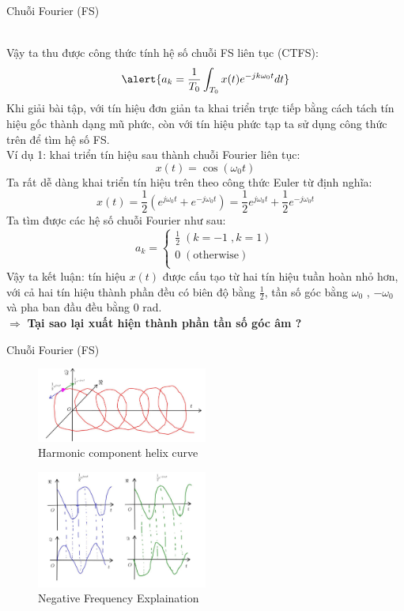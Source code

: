\documentclass[8pt]{beamer}
\begin{document}
\begin{frame}{Chuỗi Fourier (FS)}

\\ Vậy ta thu được công thức tính hệ số chuỗi FS liên tục (CTFS):
$$\alert{a_{k}=\frac{1}{T_{0}}\int_{T_{0}}x(t)e^{-jk\omega_{0}t}dt}$$
Khi giải bài tập, với tín hiệu đơn giản ta khai triển trực tiếp bằng cách tách tín hiệu gốc thành dạng mũ phức, còn với tín hiệu phức tạp ta sử dụng công thức trên để tìm hệ số FS.
\\ Ví dụ 1: khai triển tín hiệu sau thành chuỗi Fourier liên tục:
$$x(t)=\cos(\omega_{0}t)$$
Ta rất dễ dàng khai triển tín hiệu trên theo công thức Euler từ định nghĩa:
$$x(t)=\frac{1}{2}\left(e^{j\omega_{0}t}+e^{-j\omega_{0}t}\right)=\frac{1}{2}e^{j\omega_{0}t}+\frac{1}{2}e^{-j\omega_{0}t}$$
Ta tìm được các hệ số chuỗi Fourier như sau:
\begin{equation*}
	a_{k}=
	\begin{cases}
		\frac{1}{2}\; (k=-1\; , k=1)	\\
		0 \;(\text{otherwise})\\
\end{cases}
\end{equation*}
Vậy ta kết luận: tín hiệu $x(t)$ được cấu tạo từ hai tín hiệu tuần hoàn nhỏ hơn, với cả hai tín hiệu thành phần đều có \alert{biên độ} bằng $\frac{1}{2}$, \alert{tần số góc} bằng $\omega_{0}$ , $-\omega_{0}$ và \alert{pha ban đầu} đều bằng $0$ rad. \\$\Rightarrow$ \textbf{Tại sao lại xuất hiện thành phần tần số góc âm ?}
\end{frame}
\begin{frame}{Chuỗi Fourier (FS)}
\begin{figure}[h]
			\includegraphics[width=0.5\textwidth]{helix.jpg}
			\caption{Harmonic component helix curve}\label{fig:re11}
		\end{figure}
\begin{figure}[h]
			\includegraphics[width=0.5\textwidth]{imaginary.jpg}
			\caption{Negative Frequency Explaination}\label{fig:re11}

		\end{figure}
\end{frame}
\end{document}

